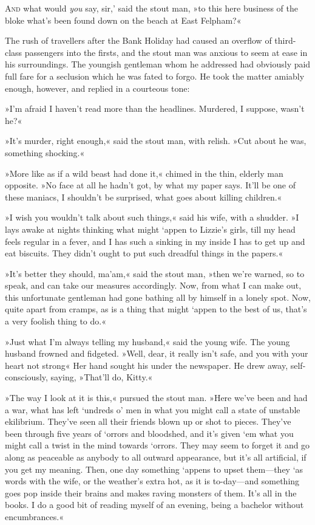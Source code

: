 
\lettrine[lines=4,ante=‘]{A}{nd} what would \textit{you} say, sir,' said the stout man, »to this here business of the bloke what's been found down on the beach at East Felpham?«

\zz
The rush of travellers after the Bank Holiday had caused an overflow of third-class passengers into the firsts, and the stout man was anxious to seem at ease in his surroundings. The youngish gentleman whom he addressed had obviously paid full fare for a seclusion which he was fated to forgo. He took the matter amiably enough, however, and replied in a courteous tone:

»I'm afraid I haven't read more than the headlines. Murdered, I suppose, wasn't he?«

»It's murder, right enough,« said the stout man, with relish. »Cut about he was, something shocking.«

»More like as if a wild beast had done it,« chimed in the thin, elderly man opposite. »No face at all he hadn't got, by what my paper says. It'll be one of these maniacs, I shouldn't be surprised, what goes about killing children.«

»I wish you wouldn't talk about such things,« said his wife, with a shudder. »I lays awake at nights thinking what might `appen to Lizzie's girls, till my head feels regular in a fever, and I has such a sinking in my inside I has to get up and eat biscuits. They didn't ought to put such dreadful things in the papers.«

»It's better they should, ma'am,« said the stout man, »then we're warned, so to speak, and can take our measures accordingly. Now, from what I can make out, this unfortunate gentleman had gone bathing all by himself in a lonely spot. Now, quite apart from cramps, as is a thing that might `appen to the best of us, that's a very foolish thing to do.«

»Just what I'm always telling my husband,« said the young wife. The young husband frowned and fidgeted. »Well, dear, it really isn't safe, and you with your heart not strong\longdash« Her hand sought his under the newspaper. He drew away, self-consciously, saying, »That'll do, Kitty.«

»The way I look at it is this,« pursued the stout man. »Here we've been and had a war, what has left `undreds o' men in what you might call a state of unstable ekilibrium. They've seen all their friends blown up or shot to pieces. They've been through five years of `orrors and bloodshed, and it's given `em what you might call a twist in the mind towards `orrors. They may seem to forget it and go along as peaceable as anybody to all outward appearance, but it's all artificial, if you get my meaning. Then, one day something `appens to upset them—they `as words with the wife, or the weather's extra hot, as it is to-day—and something goes pop inside their brains and makes raving monsters of them. It's all in the books. I do a good bit of reading myself of an evening, being a bachelor without encumbrances.«

